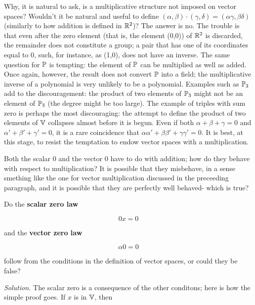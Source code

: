 Why, it is natural to ask, is a multiplicative structure not imposed on vector spaces? Wouldn't it be natural and useful to define $(\alpha, \beta) \cdot (\gamma, \delta) = (\alpha\gamma, \beta\delta)$ (similarly to how addition is defined in $\R^2$)? The answer is no. The trouble is that even after the zero element (that is, the element (0,0)) of $\R^2$ is discarded, the remainder does not constitute a group; a pair that has one of its coordinates equal to 0, such, for instance, as (1,0), does not have an inverse. The same question for $\P$ is tempting: the element of $\P$ can be multiplied as well as added. Once again, however, the result does not convert $\P$ into a field; the multiplicative inverse of a polynomial is very unlikely to be a polynomial. Examples such as $\P_3$ add to the discouragement: the product of two elements of $\P_3$ might not be an element of $\P_3$ (the degree might be too large). The example of triples with sum zero is perhaps the most discouraging: the attempt to define the product of two elements of $\V$ collapses almost before it is begun. Even if both $\alpha + \beta + \gamma = 0$ and $\alpha' + \beta' + \gamma' = 0$, it is a rare coincidence that $\alpha\alpha' + \beta\beta' + \gamma\gamma' = 0$. It is best, at this stage, to resist the temptation to endow vector spaces with a multiplication.

Both the scalar 0 and the vector 0 have to do with addition; how do they behave with respect to multiplication? It is possible that they misbehave, in a sense smething like the one for vector multiplication discussed in the preceeding paragraph, and it is possible that they are perfectly well behaved- which is true?

\begin{problem}
Do the \textbf{scalar zero law}

\begin{equation}
    0x = 0
\end{equation}

and the \textbf{vector zero law}

\begin{equation}
    \alpha0 = 0
\end{equation}

follow from the conditions in the definition of vector spaces, or could they be false?
\end{problem}

\textit{Solution.} The scalar zero is a consequence of the other conditons; here is how the simple proof goes. If $x$ is in $\V$, then

